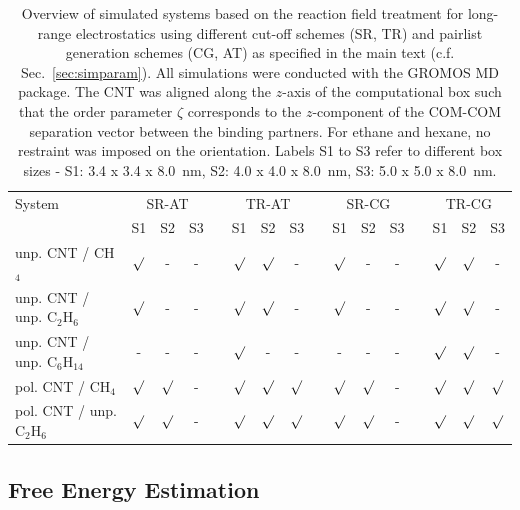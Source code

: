 \documentclass[9pt,lessons,pubversion]{livecoms}
\begin{document}
\begin{table}[ht]
\caption{\label{tbl:overview_RF}
Overview of simulated systems based on the reaction field treatment for long-range electrostatics using different cut-off schemes (SR, TR) and pairlist generation schemes (CG, AT) as 
specified in the main text (c.f. Sec.~\ref{sec:simparam}). 
All simulations were conducted with the GROMOS MD package. 
The CNT was aligned along the $z$-axis of the computational box such that the order parameter $\zeta$ corresponds to the $z$-component of the COM-COM separation vector 
between the binding partners. For ethane and hexane, no restraint was imposed on the orientation. 
Labels S1 to S3 refer to different box sizes - S1: 3.4 x 3.4 x 8.0~nm, S2: 4.0 x 4.0 x 8.0~nm, S3: 5.0 x 5.0 x 8.0~nm.
}
\centering
\begin{tabular}{l ccc c ccc c ccc c ccc}\hline
System & \multicolumn{3}{c}{SR-AT} & & \multicolumn{3}{c}{TR-AT} & & \multicolumn{3}{c}{SR-CG} & & \multicolumn{3}{c}{TR-CG}\\
\cline{2-4} \cline{6-8} \cline{10-12} \cline{14-16}
& S1 & S2 & S3 && S1 & S2 &  S3 && S1 & S2 & S3 && S1 & S2 & S3\\
\hline
unp. CNT / CH$_4$  & $\surd$ & - & - && $\surd$ & $\surd$ & - && $\surd$ & - & - &&  $\surd$ & $\surd$ & -\\
unp. CNT / unp. C$_2$H$_6$ & $\surd$ & - & - && $\surd$ & $\surd$ & - && $\surd$ & - & - &&  $\surd$ & $\surd$ & -\\
unp. CNT / unp. C$_6$H$_{14}$ & - & - & - && $\surd$ & - & - && - & - & - &&  $\surd$ & $\surd$ & -\\
\hline
pol. CNT / CH$_4$ & $\surd$ & $\surd$ & - && $\surd$ & $\surd$ & $\surd$ && $\surd$ & $\surd$ & - &&  $\surd$ & $\surd$ & $\surd$\\
pol. CNT / unp. C$_2$H$_6$ & $\surd$ & $\surd$ & - && $\surd$ & $\surd$ & $\surd$ && $\surd$ & $\surd$ & - &&  $\surd$ & $\surd$ & $\surd$\\
\hline
\end{tabular}
\end{table}


\subsection{Free Energy Estimation}
\label{sec:estimators}
\end{document}
